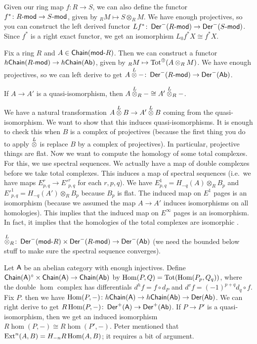 \begin{example}
 Given our ring map $f\colon R\to S$, we can also define the functor $f^*\colon R\mod\to S\mod$, given by ${}_R M\mapsto S\otimes_R M$. We have enough projectives, so you can construct the left derived functor $Lf^*\colon \Der^-(R\mod)\to \Der^-(S\mod)$. Since $f^*$ is a right exact functor, we get an isomorphism $L_0f^* X\cong f^*X$.
\end{example}
Fix a ring $R$ and $A\in \chain(\rmod R)$. Then we can construct a functor $h\chain(R\mod)\to h\chain(\ab)$, given by ${}_RM\mapsto \tot^\oplus(A\otimes_R M)$. We have enough projectives, so we can left derive to get $A\lotimes -\colon \Der^-(R\mod)\to \Der^-(\ab)$.
\begin{claim}
 If $A\to A'$ is a quasi-isomorphism, then $A\lotimes_R- \cong A'\lotimes_R-$.
\end{claim}
We have a natural transformation $A\lotimes B\to A'\lotimes B$ coming from the quasi-isomorphism. We want to show that this induces quasi-isomorphisms. It is enough to check this when $B$ is a complex of projectives (because the first thing you do to apply $\lotimes$ is replace $B$ by a complex of projectives). In particular, projective things are flat. Now we want to compute the homology of some total complexes. For this, we use spectral sequences. We actually have a map of double complexes before we take total complexes. This induces a map of spectral sequences (i.e.~we have maps $E^r_{p,q}\to E'^r_{p,q}$ for each $r,p,q$). We have $E^1_{p,q}=H_{-q}(A)\otimes_R B_p$ and $E'^1_{p,q}=H_{-q}(A')\otimes_R B_p$ because $B_p$ is flat. The induced map on $E^1$ pages is an isomorphism (because we assumed the map $A\to A'$ induces isomorphisms on all homologies). This implies that the induced map on $E^\infty$ pages is an isomorphism. In fact, it implies that the homologies of the total complexes are isomorphic .
\begin{corollary}
 $\lotimes_R\colon \Der^-(\rmod R)\times \Der^-(R\mod)\to \Der^-(\ab)$ (we need the bounded below stuff to make sure the spectral sequence converges).
\end{corollary}

Let $\A$ be an abelian category with enough injectives. Define $\chain(\A)^\circ\times \chain(\A)\to \chain(\ab)$ by $\hom(P,Q) = \tot(\hom(P_p,Q_q))$, where the double $\hom$ complex has differentials $d^h f= f\circ d_P$ and $d^v f=(-1)^{p+q}d_q\circ f$. Fix $P$. then we have $\hom(P,-)\colon h\chain(\A)\to h\chain(\ab)\to \Der(\ab)$. We can right derive to get $R\hom(P,-)\colon \Der^+(\A)\to \Der^+(\ab)$. If $P\to P'$ is a quasi-isomorphism, then we get an induced isomorphism $R\hom(P,-)\cong R\hom(P',-)$. Peter mentioned that $\ext^n(A,B)=H_{-n}R\hom(A,B)$; it requires a bit of argument.

